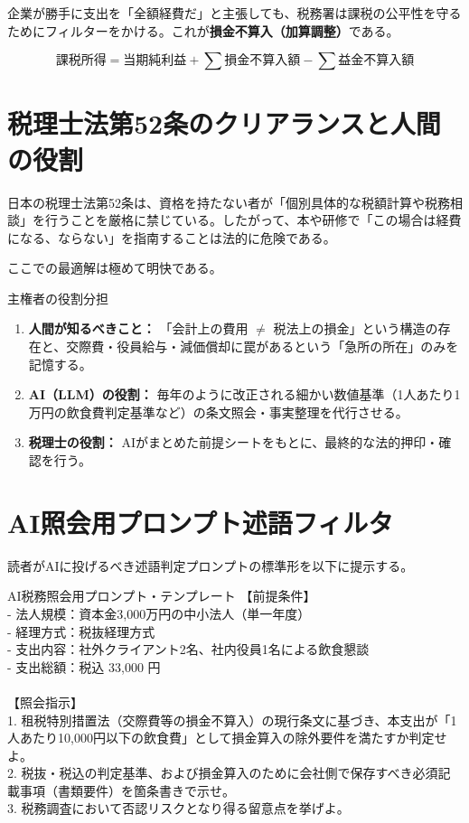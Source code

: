 \documentclass[11pt, a4paper]{report}
\begin{document}
企業が勝手に支出を「全額経費だ」と主張しても、税務署は課税の公平性を守るためにフィルターをかける。これが\textbf{損金不算入（加算調整）}である。

\begin{equation}
    \text{課税所得} = \text{当期純利益} + \sum \text{損金不算入額} - \sum \text{益金不算入額}
\end{equation}

\section{税理士法第52条のクリアランスと人間の役割}

日本の税理士法第52条は、資格を持たない者が「個別具体的な税額計算や税務相談」を行うことを厳格に禁じている。したがって、本や研修で「この場合は経費になる、ならない」を指南することは法的に危険である。

ここでの最適解は極めて明快である。
\begin{rulebox}{主権者の役割分担}
\begin{enumerate}
    \item \textbf{人間が知るべきこと：} 「会計上の費用 $\neq$ 税法上の損金」という構造の存在と、交際費・役員給与・減価償却に罠があるという「急所の所在」のみを記憶する。
    \item \textbf{AI（LLM）の役割：} 毎年のように改正される細かい数値基準（1人あたり1万円の飲食費判定基準など）の条文照会・事実整理を代行させる。
    \item \textbf{税理士の役割：} AIがまとめた前提シートをもとに、最終的な法的押印・確認を行う。
\end{enumerate}
\end{rulebox}

\section{AI照会用プロンプト述語フィルタ}

読者がAIに投げるべき述語判定プロンプトの標準形を以下に提示する。

\begin{calcbox}{AI税務照会用プロンプト・テンプレート}
\small\ttfamily
【前提条件】\\
- 法人規模：資本金3,000万円の中小法人（単一年度）\\
- 経理方式：税抜経理方式\\
- 支出内容：社外クライアント2名、社内役員1名による飲食懇談\\
- 支出総額：税込 33,000 円\\
\\
【照会指示】\\
1. 租税特別措置法（交際費等の損金不算入）の現行条文に基づき、本支出が「1人あたり10,000円以下の飲食費」として損金算入の除外要件を満たすか判定せよ。\\
2. 税抜・税込の判定基準、および損金算入のために会社側で保存すべき必須記載事項（書類要件）を箇条書きで示せ。\\
3. 税務調査において否認リスクとなり得る留意点を挙げよ。
\end{calcbox}
\end{document}
